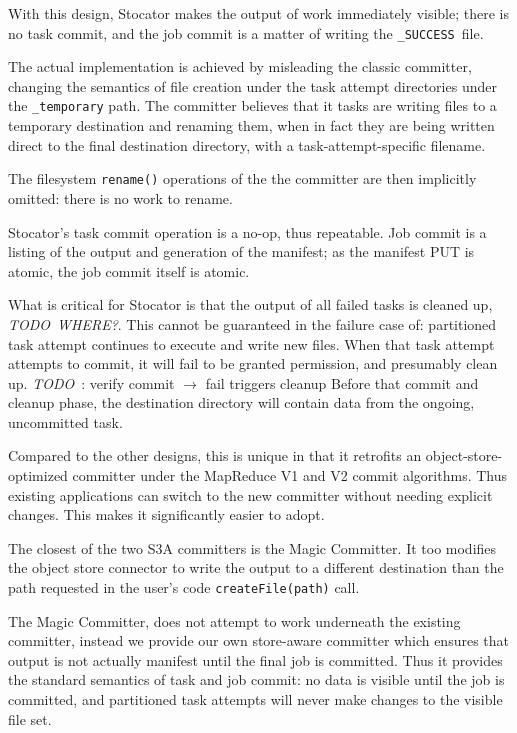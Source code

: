 \documentclass[conference]{IEEEtran}
\newcommand{\SUCCESS}{\texttt{\_SUCCESS}\ }
\newcommand{\TODO}{\emph{TODO}\ }
\begin{document}
With this design, Stocator makes the output of work immediately visible;
there is no task commit, and the job commit is a matter of writing
the \SUCCESS file.

The actual implementation is achieved by misleading the classic committer,
changing the semantics of file creation under the task attempt directories
under the \texttt{\_temporary} path.
The committer believes that it tasks are writing files to a temporary destination
and renaming them, when in fact they are being written direct to the final destination directory,
with a task-attempt-specific filename.

The filesystem \texttt{rename()} operations of the the committer are then implicitly
omitted: there is no work to rename.


Stocator's task commit operation is a no-op, thus repeatable.
Job commit is a listing of the output and generation of the manifest;
as the manifest PUT is atomic, the job commit itself is atomic.


What is critical for Stocator is that the output of all failed tasks
is cleaned up, \TODO \emph{WHERE?}.
This cannot be guaranteed in the failure case of: partitioned task attempt
continues to execute and write new files.
When that task attempt attempts to commit, it will fail to be granted permission,
and presumably clean up.
\TODO: verify commit $\rightarrow$ fail triggers cleanup
Before that commit and cleanup phase, the destination directory will contain
data from the ongoing, uncommitted task.

Compared to the other designs, this is unique in that it retrofits an
object-store-optimized  committer under the MapReduce V1 and V2 commit algorithms.
Thus existing applications can switch to the new committer without needing
explicit changes.
This makes it significantly easier to adopt.


The closest of the two S3A committers is the Magic Committer.
It too modifies the object store connector to write the output to a
different destination than the path requested
in the user's code \texttt{createFile(path)} call.

The Magic Committer, does not attempt to work underneath the existing committer,
instead we provide our own store-aware committer
which ensures that output is not actually manifest until
the final job is committed.
Thus it provides the standard semantics of task and job commit: no data is
visible until the job is committed, and partitioned task attempts will
never make changes to the visible file set.
\end{document}
